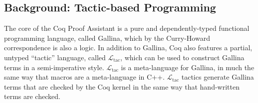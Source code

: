 \documentclass[preprint]{sigplanconf}
\newcommand{\ltac}[0]{\ensuremath{\mathcal{L}_{\mathrm{tac}}}}
\begin{document}

\subsection{Background: Tactic-based Programming}
\label{sec:tactic-based}

The core of the Coq Proof Assistant is a pure and dependently-typed functional programming language, called Gallina, which by the Curry-Howard correspondence is also a logic.
In addition to Gallina, Coq also features a partial, untyped ``tactic'' language, called \ltac{}, which can be used to construct Gallina terms in a semi-imperative style. 
\ltac{} is a meta-language for Gallina, in much the same way that macros are a meta-language in C++.
\ltac{} tactics generate Gallina terms that are checked by the Coq kernel in the same way that hand-written terms are checked.
\end{document}
